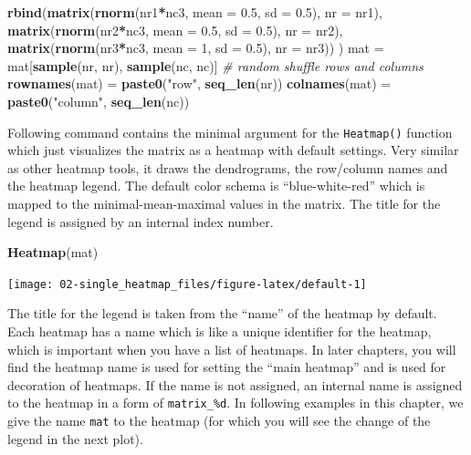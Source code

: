\documentclass[]{book}
\newenvironment{Shaded}{\begin{snugshade}}{\end{snugshade}}
\newcommand{\KeywordTok}[1]{\textcolor[rgb]{0.13,0.29,0.53}{\textbf{#1}}}
\newcommand{\DataTypeTok}[1]{\textcolor[rgb]{0.13,0.29,0.53}{#1}}
\newcommand{\DecValTok}[1]{\textcolor[rgb]{0.00,0.00,0.81}{#1}}
\newcommand{\FloatTok}[1]{\textcolor[rgb]{0.00,0.00,0.81}{#1}}
\newcommand{\StringTok}[1]{\textcolor[rgb]{0.31,0.60,0.02}{#1}}
\newcommand{\CommentTok}[1]{\textcolor[rgb]{0.56,0.35,0.01}{\textit{#1}}}
\newcommand{\OperatorTok}[1]{\textcolor[rgb]{0.81,0.36,0.00}{\textbf{#1}}}
\newcommand{\NormalTok}[1]{#1}
\theoremstyle{definition}
\theoremstyle{definition}
\theoremstyle{definition}
\theoremstyle{remark}
\begin{document}
\begin{Shaded}
\begin{Highlighting}[]
    \KeywordTok{rbind}\NormalTok{(}\KeywordTok{matrix}\NormalTok{(}\KeywordTok{rnorm}\NormalTok{(nr1}\OperatorTok{*}\NormalTok{nc3, }\DataTypeTok{mean =} \FloatTok{0.5}\NormalTok{, }\DataTypeTok{sd =} \FloatTok{0.5}\NormalTok{), }\DataTypeTok{nr =}\NormalTok{ nr1),}
          \KeywordTok{matrix}\NormalTok{(}\KeywordTok{rnorm}\NormalTok{(nr2}\OperatorTok{*}\NormalTok{nc3, }\DataTypeTok{mean =} \FloatTok{0.5}\NormalTok{, }\DataTypeTok{sd =} \FloatTok{0.5}\NormalTok{), }\DataTypeTok{nr =}\NormalTok{ nr2),}
          \KeywordTok{matrix}\NormalTok{(}\KeywordTok{rnorm}\NormalTok{(nr3}\OperatorTok{*}\NormalTok{nc3, }\DataTypeTok{mean =} \DecValTok{1}\NormalTok{,   }\DataTypeTok{sd =} \FloatTok{0.5}\NormalTok{), }\DataTypeTok{nr =}\NormalTok{ nr3))}
\NormalTok{   )}
\NormalTok{mat =}\StringTok{ }\NormalTok{mat[}\KeywordTok{sample}\NormalTok{(nr, nr), }\KeywordTok{sample}\NormalTok{(nc, nc)] }\CommentTok{# random shuffle rows and columns}
\KeywordTok{rownames}\NormalTok{(mat) =}\StringTok{ }\KeywordTok{paste0}\NormalTok{(}\StringTok{"row"}\NormalTok{, }\KeywordTok{seq_len}\NormalTok{(nr))}
\KeywordTok{colnames}\NormalTok{(mat) =}\StringTok{ }\KeywordTok{paste0}\NormalTok{(}\StringTok{"column"}\NormalTok{, }\KeywordTok{seq_len}\NormalTok{(nc))}
\end{Highlighting}
\end{Shaded}

Following command contains the minimal argument for the
\texttt{Heatmap()} function which just visualizes the matrix as a
heatmap with default settings. Very similar as other heatmap tools, it
draws the dendrograms, the row/column names and the heatmap legend. The
default color schema is ``blue-white-red'' which is mapped to the
minimal-mean-maximal values in the matrix. The title for the legend is
assigned by an internal index number.

\begin{Shaded}
\begin{Highlighting}[]
\KeywordTok{Heatmap}\NormalTok{(mat)}
\end{Highlighting}
\end{Shaded}

\begin{center}\texttt{[image: 02-single\_heatmap\_files/figure-latex/default-1]} \end{center}

The title for the legend is taken from the ``name'' of the heatmap by
default. Each heatmap has a name which is like a unique identifier for
the heatmap, which is important when you have a list of heatmaps. In
later chapters, you will find the heatmap name is used for setting the
``main heatmap'' and is used for decoration of heatmaps. If the name is
not assigned, an internal name is assigned to the heatmap in a form of
\texttt{matrix\_\%d}. In following examples in this chapter, we give the
name \texttt{mat} to the heatmap (for which you will see the change of
the legend in the next plot).
\end{document}
